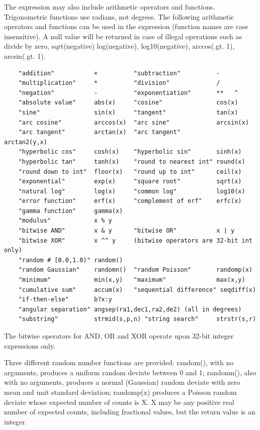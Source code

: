 \documentclass[11pt]{book}
\begin{document}
The expression may  also include arithmetic operators and functions.
Trigonometric  functions use  radians,  not degrees.  The  following
arithmetic  operators and  functions  can be  used in the expression
(function names are case insensitive).  A null value will be returned
in case of illegal operations such as divide by zero, sqrt(negative)
log(negative), log10(negative), arccos(.gt. 1), arcsin(.gt. 1).

\begin{verbatim}
    "addition"           +          "subtraction"          -
    "multiplication"     *          "division"             /
    "negation"           -          "exponentiation"       **   ^
    "absolute value"     abs(x)     "cosine"               cos(x)
    "sine"               sin(x)     "tangent"              tan(x)
    "arc cosine"         arccos(x)  "arc sine"             arcsin(x)
    "arc tangent"        arctan(x)  "arc tangent"          arctan2(y,x)
    "hyperbolic cos"     cosh(x)    "hyperbolic sin"       sinh(x)
    "hyperbolic tan"     tanh(x)    "round to nearest int" round(x)
    "round down to int"  floor(x)   "round up to int"      ceil(x)
    "exponential"        exp(x)     "square root"          sqrt(x)
    "natural log"        log(x)     "common log"           log10(x)
    "error function"     erf(x)     "complement of erf"    erfc(x)
    "gamma function"     gamma(x)
    "modulus"            x % y
    "bitwise AND"        x & y      "bitwise OR"           x | y
    "bitwise XOR"        x ^^ y     (bitwise operators are 32-bit int only)
    "random # [0.0,1.0)" random()
    "random Gaussian"    randomn()  "random Poisson"       randomp(x)
    "minimum"            min(x,y)   "maximum"              max(x,y)
    "cumulative sum"     accum(x)   "sequential difference" seqdiff(x)
    "if-then-else"       b?x:y
    "angular separation" angsep(ra1,dec1,ra2,de2) (all in degrees)
    "substring"          strmid(s,p,n) "string search"     strstr(s,r)
\end{verbatim}
The bitwise operators for AND, OR and XOR operate upon 32-bit integer
expressions only.

Three different random number functions are provided: random(), with
no arguments, produces a uniform random deviate between 0 and 1;
randomn(), also with no arguments, produces a normal (Gaussian) random
deviate with zero mean and unit standard deviation; randomp(x)
produces a Poisson random deviate whose expected number of counts is
X.  X may be any positive real number of expected counts, including
fractional values, but the return value is an integer.
\end{document}
